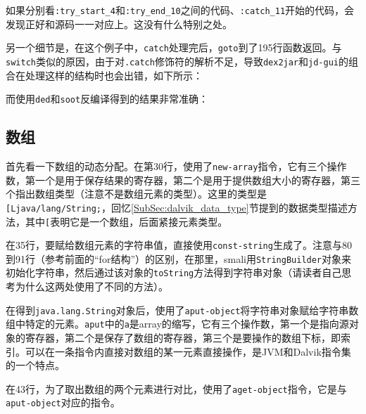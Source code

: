 如果分别看\lstinline!:try_start_4!和\lstinline!:try_end_10!之间的代码、\lstinline!:catch_11!开始的代码，会发现正好和源码一一对应上。这没有什么特别之处。

另一个细节是，在这个例子中，\lstinline!catch!处理完后，\lstinline!goto!到了195行函数返回。与\lstinline!switch!类似的原因，由于对\lstinline!.catch!修饰符的解析不足，导致\lstinline!dex2jar!和\lstinline!jd-gui!的组合在处理这样的结构时也会出错，如下所示：


而使用\lstinline!ded!和\lstinline!soot!反编译得到的结果非常准确：


\subsection{数组}



首先看一下数组的动态分配。在第30行，使用了\lstinline!new-array!指令，它有三个操作数，第一个是用于保存结果的寄存器，第二个是用于提供数组大小的寄存器，第三个指出数组类型（注意不是数组元素的类型）。这里的类型是\lstinline![Ljava/lang/String;!，回忆\ref{SubSec:dalvik_data_type}节提到的数据类型描述方法，其中\lstinline![!表明它是一个数组，后面紧接元素类型。

在35行，要赋给数组元素的字符串值，直接使用\lstinline!const-string!生成了。注意与80到91行（参考前面的“for结构”）的区别，在那里，smali用\lstinline!StringBuilder!对象来初始化字符串，然后通过该对象的\lstinline!toString!方法得到字符串对象（请读者自己思考为什么这两处使用了不同的方法）。

在得到\lstinline!java.lang.String!对象后，使用了\lstinline!aput-object!将字符串对象赋给字符串数组中特定的元素。\lstinline!aput!中的\lstinline!a!是array的缩写，它有三个操作数，第一个是指向源对象的寄存器，第二个是保存了数组的寄存器，第三个是要操作的数组下标，即索引。可以在一条指令内直接对数组的某一元素直接操作，是JVM和Dalvik指令集的一个特点。

在43行，为了取出数组的两个元素进行对比，使用了\lstinline!aget-object!指令，它是与\lstinline!aput-object!对应的指令。

